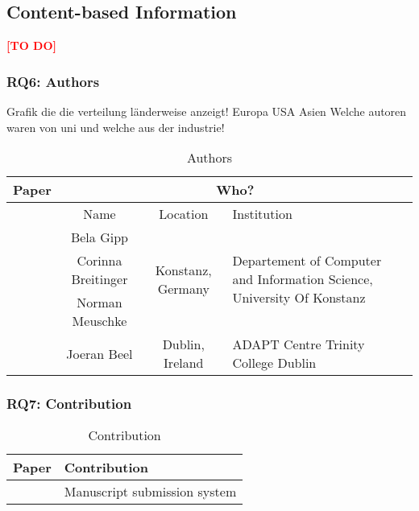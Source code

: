 
\subsection{Content-based Information}
\label{subsec:ContentBasedInformation}
\textcolor{red}{\textbf{[TO DO]}}


\clearpage
\subsubsection{RQ6: Authors}

Grafik die die verteilung länderweise anzeigt! Europa USA Asien
Welche autoren waren von uni und welche aus der industrie!


\begin{longtable}{ |c|c|c|p{5cm}| }
	\caption{Authors} \\
	\hline
 	\textbf{Paper} & \multicolumn{3}{|c|}{\textbf{Who?}} \\ [0.5ex] 
 	\hline\hline
 	\endhead
 	\multirow{5}{*}{\cite{2017_Gipp}} & \cellcolor{Gray}Name & \cellcolor{Gray}Location & \cellcolor{Gray}Institution \\ 
 	\cline{2-4}
	 & Bela Gipp &  \multirow{3}{*}{Konstanz, Germany} & \multirow{3}{*}{\parbox{5cm}{\centering Departement of Computer and Information Science, University Of Konstanz}} \\
	 \cline{2-2}
	 & Corinna Breitinger &  & \\
	 \cline{2-2}
	 & Norman Meuschke &  & \\
	 \cline{2-4}
	 & Joeran Beel & Dublin, Ireland & ADAPT Centre Trinity College Dublin \\
	\hline
\end{longtable}

\clearpage
\subsubsection{RQ7: Contribution}

\begin{longtable}{ |c|p{6cm}| }
	\caption{Contribution} \\
	\hline
 	\textbf{Paper} & \textbf{Contribution} \\ [0.5ex] 
 	\hline\hline
 	\endhead
 	\cite{2017_Gipp} & Manuscript submission system\\
	\hline
\end{longtable}

